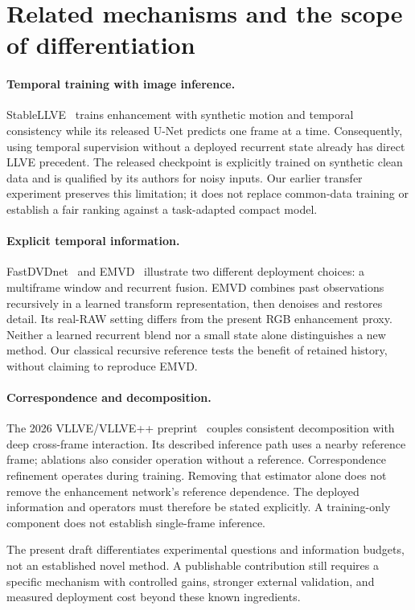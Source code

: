 \section{Related mechanisms and the scope of differentiation}
\label{sec:related}
\paragraph{Temporal training with image inference.}
StableLLVE~\cite{stablellve} trains enhancement with synthetic motion and
temporal consistency while its released U-Net predicts one frame at a time.
Consequently, using temporal supervision without a deployed recurrent state
already has direct LLVE precedent. The released checkpoint is explicitly
trained on synthetic clean data and is qualified by its authors for noisy
inputs. Our earlier transfer experiment preserves this limitation; it does
not replace common-data training or establish a fair ranking against a
task-adapted compact model.

\paragraph{Explicit temporal information.}
FastDVDnet~\cite{fastdvdnet} and EMVD~\cite{emvd} illustrate two different
deployment choices: a multiframe window and recurrent fusion. EMVD combines
past observations recursively in a learned transform representation, then
denoises and restores detail. Its real-RAW setting differs from the present
RGB enhancement proxy. Neither a learned recurrent blend nor a small state
alone distinguishes a new method. Our classical recursive reference tests
the benefit of retained history, without claiming to reproduce EMVD.

\paragraph{Correspondence and decomposition.}
The 2026 VLLVE/VLLVE++ preprint~\cite{vllveplus} couples consistent
decomposition with deep cross-frame interaction. Its described inference
path uses a nearby reference frame; ablations also consider operation
without a reference. Correspondence refinement operates during training.
Removing that estimator alone does not remove the enhancement network's
reference dependence. The deployed information and operators must therefore
be stated explicitly. A training-only component does not establish
single-frame inference.

The present draft differentiates experimental questions and information
budgets, not an established novel method. A publishable contribution still
requires a specific mechanism with controlled gains, stronger external
validation, and measured deployment cost beyond these known ingredients.
